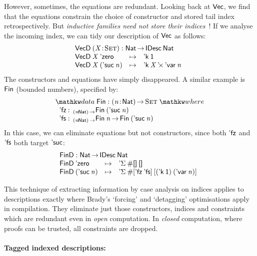 However, sometimes, the equations are redundant. 
Looking back at $\D{Vec}$, we find that the equations constrain
the choice of constructor and stored tail index retrospectively.
But \emph{inductive families need not store their
  indices}~\cite{brady:index-inductive-families}!  If we
analyse the incoming index, we can tidy our description of $\D{Vec}$
as follows:
%
\[\stk{
\VecD \:\PITEL{\V{X}}{\Set} : \Nat \To \IDesc{\Nat} \\
\begin{array}{@{}lll}
\VecD\:\V{X}\: \NatZero     & \mapsto & \DConst{\Unit} \\
\VecD\:\V{X}\: (\NatSuc{\V{n}}) & \mapsto &
 \DProd{\DConst{\V{X}}}{\DVar{\V{n}}}
\end{array}
                                       
}\]
%
The constructors and equations have simply disappeared. A similar
example is $\SYMBFin$ (bounded numbers), specified by:
%
\[
\stk{
\data \SYMBFin : \PI{\V{n}}{\Nat} \Set \where \\
\;\;\begin{array}{@{}l@{\::\:\:}l@{\quad}l}
    \FinZero      & _{\PI{\V{n}}{\Nat}}\Fin{(\NatSuc{\V{n}})}   \\
    \SYMBFinSuc   & _{\PI{\V{n}}{\Nat}}\Fin{\V{n}} \To \Fin{(\NatSuc{\V{n}})}
\end{array}
}\]
%
In this case, we can eliminate equations but not constructors, since both
$\FinZero$ and $\SYMBFinSuc$ both target $\SYMBNatSuc$:
%
\[\stk{
\FinD : \Nat \To \IDesc{\Nat} \\
\begin{array}{@{}lll}
\FinD\: \NatZero         & \mapsto & \DSigma{\EnumT{\Void}}{\Void} \\
\FinD\: (\NatSuc{\V{n}}) & \mapsto & \DSigma{\EnumT{\sqr{\FinZero\: \SYMBFinSuc}}}
                                            {\sqr{(\DConst{\Unit})\: (\DVar{\V{n}})}}
\end{array}
}\]

This technique of extracting information by case analysis on indices
applies to descriptions exactly where Brady's `forcing' and
`detagging' optimisations apply in compilation. They eliminate just
those constructors, indices and constraints which are redundant even
in \emph{open} computation. In \emph{closed} computation, where proofs
can be trusted, all constraints are dropped.


\paragraph{Tagged indexed descriptions:}

